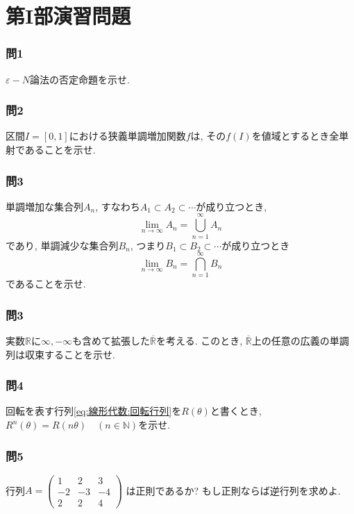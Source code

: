 \documentclass[a4j,dvipdfmx]{jsarticle}
\numberwithin{equation}{section}
\begin{document}
        \section{第I部演習問題}
            \subsubsection*{問1} $\varepsilon-N$論法の否定命題を示せ.

            \subsubsection*{問2} 区間$I=[0,1]$における狭義単調増加関数$f$は, その$f(I)$を値域とするとき全単射であることを示せ. 

            \subsubsection*{問3} 単調増加な集合列$A_n$, すなわち$A_1\subset A_2\subset\cdots$が成り立つとき, 
                \begin{equation}
                    \lim_{n\to\infty} A_n = \bigcup_{n=1}^\infty A_n
                \end{equation}
                であり, 単調減少な集合列$B_n$, つまり$B_1\subset B_2 \subset \cdots$が成り立つとき
                \begin{equation}
                    \lim_{n\to\infty} B_n = \bigcap_{n=1}^\infty B_n
                \end{equation}
                であることを示せ.
            
            \subsubsection*{問3} 実数$\mathbb{R}$に$\infty,-\infty$も含めて拡張した$\overline{\mathbb{R}}$を考える. このとき, $\overline{\mathbb{R}}$上の任意の広義の単調列は収束することを示せ.

            \subsubsection*{問4} 回転を表す行列\eqref{eq:線形代数:回転行列}を$R(\theta)$と書くとき, $R^n(\theta)=R(n\theta)\quad (n\in\mathbb{N})$を示せ.

            \subsubsection*{問5} 行列$\displaystyle A=\begin{pmatrix}1&2&3\\-2&-3&-4\\2&2&4\end{pmatrix}$ は正則であるか? もし正則ならば逆行列を求めよ.
\end{document}
